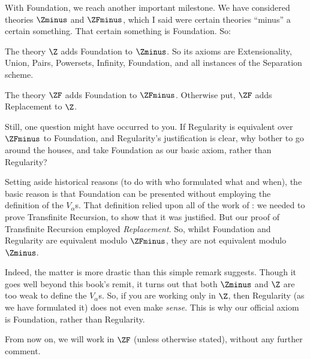 \documentclass[../../../include/open-logic-section]{subfiles}
\begin{document}
With Foundation, we reach another important milestone. We have considered theories $\Zminus$ and $\ZFminus$, which I said were certain theories ``minus'' a certain something. That certain something is Foundation. So:
\begin{defn}
	The theory $\Z$ adds Foundation to $\Zminus$. So its axioms are Extensionality, Union, Pairs, Powersets, Infinity, Foundation, and all instances of the Separation scheme.
	
	The theory $\ZF$ adds Foundation to $\ZFminus$. Otherwise put, $\ZF$ adds Replacement to $\Z$.
\end{defn}\noindent
Still, one question might have occurred to you. If Regularity is equivalent over $\ZFminus$ to Foundation, and Regularity's justification is clear, why bother to go around the houses, and take Foundation as our basic axiom, rather than Regularity? 

Setting aside historical reasons (to do with who formulated what and when), the basic reason is that Foundation can be presented without employing the definition of the $V_\alpha$s. That definition relied upon all of the work of : we needed to prove Transfinite Recursion, to show that it was justified. But our proof of Transfinite Recursion employed \emph{Replacement}. So, whilst Foundation and Regularity are equivalent modulo $\ZFminus$, they are not equivalent modulo $\Zminus$. 

Indeed, the matter is more drastic than this simple remark suggests. Though it goes well beyond this book's remit, it turns out that both $\Zminus$ and $\Z$ are too weak to define the $V_\alpha$s. So, if you are working only in $\Z$, then Regularity (as we have formulated it) does not even make \emph{sense}. This is why our official axiom is Foundation, rather than Regularity. 

From now on, we will work in $\ZF$ (unless otherwise stated), without any further comment. 
\end{document}
